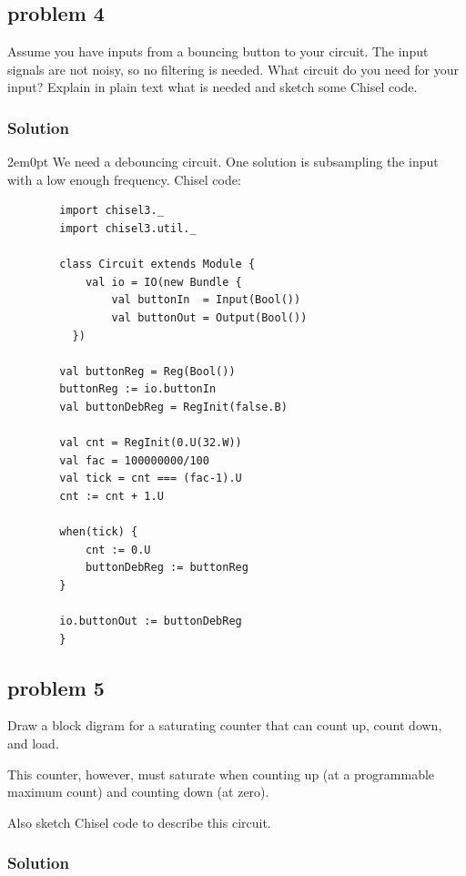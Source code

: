 \documentclass[main.tex]{subfiles}
\begin{document}
\newpage
\subsection{problem 4}
Assume you have inputs from a bouncing button to your circuit. The input signals are not noisy, so no filtering is needed. What circuit do you need for your input? Explain in plain text what is needed and sketch some Chisel code.

\subsubsection{Solution}
\begin{adjustwidth}{2em}{0pt}
    We need a debouncing circuit. One solution is subsampling the input with a low enough frequency. Chisel code:
    
    \begin{verbatim}
        import chisel3._
        import chisel3.util._
        
        class Circuit extends Module {
            val io = IO(new Bundle {
                val buttonIn  = Input(Bool())
                val buttonOut = Output(Bool())
          })

        val buttonReg = Reg(Bool())
        buttonReg := io.buttonIn
        val buttonDebReg = RegInit(false.B)
        
        val cnt = RegInit(0.U(32.W))
        val fac = 100000000/100
        val tick = cnt === (fac-1).U
        cnt := cnt + 1.U
        
        when(tick) {
            cnt := 0.U
            buttonDebReg := buttonReg
        }

        io.buttonOut := buttonDebReg
        }
    \end{verbatim}
\end{adjustwidth}

\newpage
\subsection{problem 5}
Draw a block digram for a saturating counter that can count up, count down, and load.

This counter, however, must saturate when counting up (at a programmable maximum count) and counting down (at zero).

Also sketch Chisel code to describe this circuit.

\subsubsection{Solution}
\end{document}
